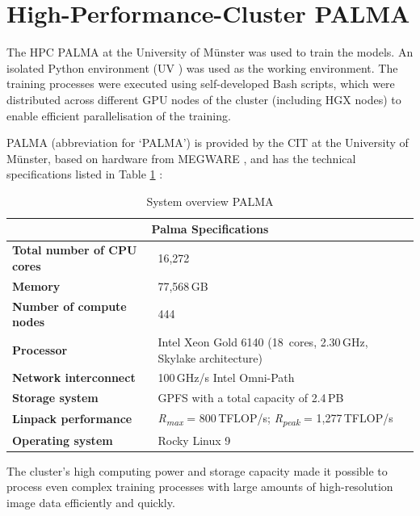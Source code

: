 \section{High-Performance-Cluster PALMA}

The \acrfull{HPC} \Acrshort{PALMA} at the University of Münster was used to train the models. An isolated Python environment (UV \cite{palma_uv}) was used as the working environment. The training processes were executed using self-developed Bash scripts, which were distributed across different \acrshort{GPU} nodes of the cluster (including HGX nodes) to enable efficient parallelisation of the training.

PALMA (abbreviation for ‘\Acrlong{PALMA}’) is provided by the \Acrfull{CIT} at the University of Münster, based on hardware from MEGWARE \cite{palma_spec}, and has the technical specifications listed in Table \ref{tab:Spec_Palma} \cite{palma_spec}:




\begin{table}[h!]
\centering
\begin{tabular}{ll}
\multicolumn{2}{c}{\textbf{Palma Specifications}} \\ \hline
\textbf{Total number of \acrshort{CPU} cores} & 16,272 \\
\textbf{Memory} & 77,568\,\acrshort{GB} \\
\textbf{Number of compute nodes} & 444 \\
\textbf{Processor} & Intel Xeon Gold 6140 (18~cores, 2.30\,\acrshort{GHz}, Skylake architecture) \\
\textbf{Network interconnect} & 100\,\acrshort{GHz}/s Intel Omni-Path \\
\textbf{Storage system} & \acrshort{GPFS} with a total capacity of 2.4\,\acrshort{PB} \\
\textbf{Linpack performance} & \textit{R\textsubscript{max}} = 800\,\acrshort{TFLOP}/s; \textit{R\textsubscript{peak}} = 1,277\,\acrshort{TFLOP}/s \\
\textbf{Operating system} & Rocky Linux 9 \\
\hline
\end{tabular}
\caption{System overview PALMA}
\label{tab:Spec_Palma}
\end{table}

The cluster's high computing power and storage capacity made it possible to process even complex training processes with large amounts of high-resolution image data efficiently and quickly.



